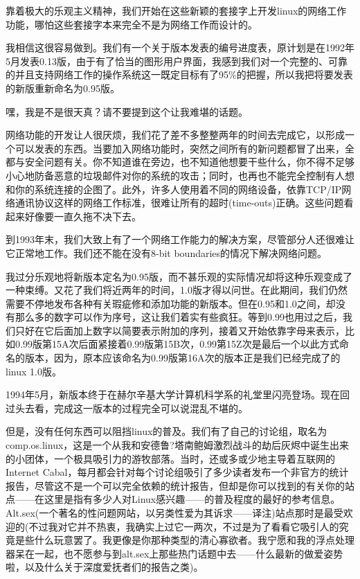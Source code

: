 靠着极大的乐观主义精神，我们开始在这些新颖的套接字上开发linux的网络工作功能，哪怕这些套接字本来完全不是为网络工作而设计的。

 

我相信这很容易做到。我们有一个关于版本发表的编号进度表，原计划是在1992年5月发表0.13版，由于有了恰当的图形用户界面，我感到我们对一个完整的、可靠的并且支持网络工作的操作系统这一既定目标有了95\%的把握，所以我把将要发表的新版重新命名为0.95版。

嘿，我是不是很天真？请不要提到这个让我难堪的话题。

网络功能的开发让人很厌烦，我们花了差不多整整两年的时间去完成它，以形成一个可以发表的东西。当要加入网络功能时，突然之间所有的新问题都冒了出来，全都与安全问题有关。你不知道谁在旁边，也不知道他想要干些什么，你不得不足够小心地防备恶意的垃圾邮件对你的系统的攻击；同时，也再也不能完全控制有人想和你的系统连接的企图了。此外，许多人使用着不同的网络设备，依靠TCP/IP网络通讯协议这样的网络工作标准，很难让所有的超时(time-outs)正确。这些问题看起来好像要一直久拖不决下去。

到1993年末，我们大致上有了一个网络工作能力的解决方案，尽管部分人还很难让它正常地工作。我们还不能在没有8-bit boundaries的情况下解决网络问题。

我过分乐观地将新版本定名为0.95版，而不甚乐观的实际情况却将这种乐观变成了一种束缚。又花了我们将近两年的时间，1.0版才得以问世。在此期间，我们仍然需要不停地发布各种有关瑕疵修和添加功能的新版本。但在0.95和1.0之间，却没有那么多的数字可以作为序号，这让我们着实有些疯狂。等到0.99也用过之后，我们只好在它后面加上数字以简要表示附加的序列，接着又开始依靠字母来表示，比如0.99版第15A次后面紧接着0.99版第15B次，0.99第15Z次是最后一个以此方式命名的版本，因为，原本应该命名为0.99版第16A次的版本正是我们已经完成了的linux 1.0版。

1994年5月，新版本终于在赫尔辛基大学计算机科学系的礼堂里闪亮登场。现在回过头去看，完成这一版本的过程完全可以说混乱不堪的。

但是，没有任何东西可以阻挡linux的普及。我们有了自己的讨论组，取名为comp.os.linux，这是一个从我和安德鲁?塔南鲍姆激烈战斗的劫后灰烬中诞生出来的小团体，一个极具吸引力的游牧部落。当时，还或多或少地主导着互联网的Internet Cabal，每月都会针对每个讨论组吸引了多少读者发布一个非官方的统计报告，尽管这不是一个可以完全依赖的统计报告，但却是你可以找到的有关你的站点——在这里是指有多少人对Linux感兴趣——的普及程度的最好的参考信息。Alt.sex(一个著名的性问题网站，以另类性爱为其诉求——译注)站点那时是最受欢迎的(不过我对它并不热衷，我确实上过它一两次，不过是为了看看它吸引人的究竟是些什么玩意罢了。我更像是你那种类型的清心寡欲者。我宁愿和我的浮点处理器呆在一起，也不愿参与到alt.sex上那些热门话题中去——什么最新的做爱姿势啦，以及什么关于深度爱抚者们的报告之类)。

